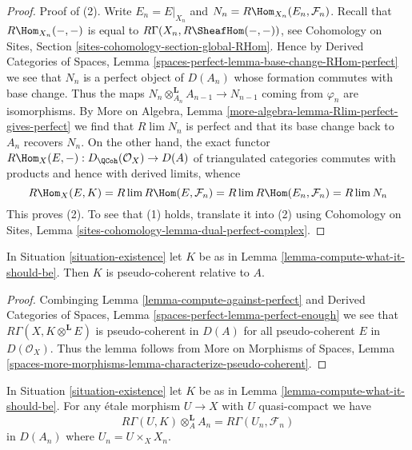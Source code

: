 \begin{proof}
Proof of (2). Write $E_n = E|_{X_n}$ and
$N_n = R\Hom_{X_n}(E_n, \mathcal{F}_n)$.
Recall that $R\Hom_{X_n}(-, -)$ is equal to
$R\Gamma(X_n, R\SheafHom(-, -))$, see
Cohomology on Sites, Section \ref{sites-cohomology-section-global-RHom}.
Hence by Derived Categories of Spaces, Lemma
\ref{spaces-perfect-lemma-base-change-RHom-perfect}
we see that $N_n$ is a perfect object of $D(A_n)$
whose formation commutes with base change. Thus the maps
$N_n \otimes_{A_n}^\mathbf{L} A_{n - 1} \to N_{n - 1}$
coming from $\varphi_n$ are isomorphisms.
By More on Algebra, Lemma \ref{more-algebra-lemma-Rlim-perfect-gives-perfect}
we find that $R\lim N_n$ is perfect and
that its base change back to $A_n$ recovers $N_n$.
On the other hand, the exact functor
$R\Hom_X(E, -) : D_\QCoh(\mathcal{O}_X) \to D(A)$
of triangulated categories commutes with products
and hence with derived limits, whence
$$
R\Hom_X(E, K) =
R\lim R\Hom(E, \mathcal{F}_n) =
R\lim R\Hom(E_n, \mathcal{F}_n) =
R\lim N_n
$$
This proves (2). To see that (1) holds, translate it into (2)
using Cohomology on Sites, Lemma
\ref{sites-cohomology-lemma-dual-perfect-complex}.
\end{proof}

\begin{lemma}
\label{lemma-relative-pseudo-coherence}
In Situation \ref{situation-existence} let $K$ be as in
Lemma \ref{lemma-compute-what-it-should-be}. Then $K$
is pseudo-coherent relative to $A$.
\end{lemma}

\begin{proof}
Combinging Lemma \ref{lemma-compute-against-perfect} and
Derived Categories of Spaces, Lemma \ref{spaces-perfect-lemma-perfect-enough}
we see that $R\Gamma(X, K \otimes^\mathbf{L} E)$
is pseudo-coherent in $D(A)$ for all pseudo-coherent
$E$ in $D(\mathcal{O}_X)$. Thus the lemma follows from
More on Morphisms of Spaces, Lemma
\ref{spaces-more-morphisms-lemma-characterize-pseudo-coherent}.
\end{proof}

\begin{lemma}
\label{lemma-compute-over-affine}
In Situation \ref{situation-existence} let $K$ be as in
Lemma \ref{lemma-compute-what-it-should-be}. For any
\'etale morphism $U \to X$ with $U$ quasi-compact we have
$$
R\Gamma(U, K) \otimes_A^\mathbf{L} A_n =
R\Gamma(U_n, \mathcal{F}_n)
$$
in $D(A_n)$ where $U_n = U \times_X X_n$.
\end{lemma}

